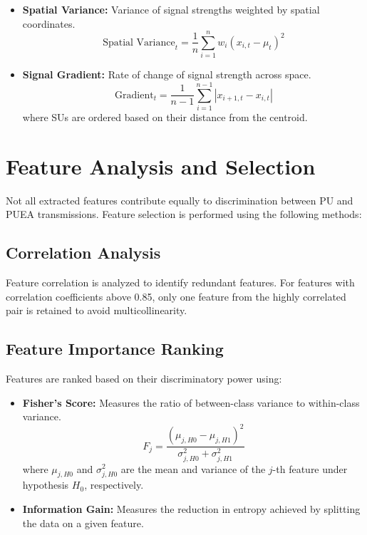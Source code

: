 \begin{itemize}
    \item \textbf{Spatial Variance:} Variance of signal strengths weighted by spatial coordinates.
    \begin{equation}
        \text{Spatial Variance}_t = \frac{1}{n}\sum_{i=1}^{n}w_i(x_{i,t}-\mu_t)^2
    \end{equation}
    
    \item \textbf{Signal Gradient:} Rate of change of signal strength across space.
    \begin{equation}
        \text{Gradient}_t = \frac{1}{n-1}\sum_{i=1}^{n-1}|x_{i+1,t}-x_{i,t}|
    \end{equation}
    where SUs are ordered based on their distance from the centroid.
\end{itemize}

\section{Feature Analysis and Selection}

Not all extracted features contribute equally to discrimination between PU and PUEA transmissions. Feature selection is performed using the following methods:

\subsection{Correlation Analysis}

Feature correlation is analyzed to identify redundant features. For features with correlation coefficients above 0.85, only one feature from the highly correlated pair is retained to avoid multicollinearity.

\subsection{Feature Importance Ranking}

Features are ranked based on their discriminatory power using:

\begin{itemize}
    \item \textbf{Fisher's Score:} Measures the ratio of between-class variance to within-class variance.
    \begin{equation}
        F_j = \frac{(\mu_{j,H0}-\mu_{j,H1})^2}{\sigma_{j,H0}^2 + \sigma_{j,H1}^2}
    \end{equation}
    where $\mu_{j,H0}$ and $\sigma_{j,H0}^2$ are the mean and variance of the $j$-th feature under hypothesis $H_0$, respectively.
    
    \item \textbf{Information Gain:} Measures the reduction in entropy achieved by splitting the data on a given feature.
\end{itemize}

